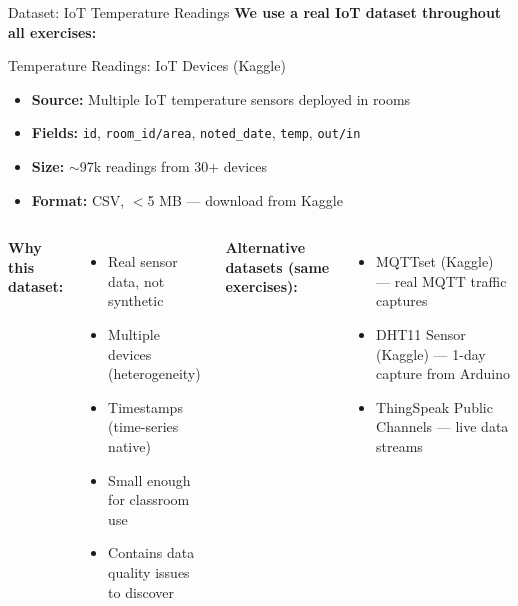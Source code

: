 \documentclass[aspectratio=169,11pt]{beamer}
\begin{document}
\begin{frame}{Dataset: IoT Temperature Readings}
    \textbf{We use a real IoT dataset throughout all exercises:}

    \vspace{0.2cm}
    \begin{block}{Temperature Readings: IoT Devices (Kaggle)}
        \begin{itemize}
            \item \textbf{Source:} Multiple IoT temperature sensors deployed in rooms
            \item \textbf{Fields:} \texttt{id}, \texttt{room\_id/area}, \texttt{noted\_date}, \texttt{temp}, \texttt{out/in}
            \item \textbf{Size:} $\sim$97k readings from 30+ devices
            \item \textbf{Format:} CSV, $<$5 MB --- download from Kaggle
        \end{itemize}
    \end{block}

    \vspace{0.2cm}
    \begin{columns}
        \textbf{Why this dataset:}
        \begin{itemize}
            \item Real sensor data, not synthetic
            \item Multiple devices (heterogeneity)
            \item Timestamps (time-series native)
            \item Small enough for classroom use
            \item Contains data quality issues to discover
        \end{itemize}

        \textbf{Alternative datasets (same exercises):}
        \begin{itemize}
            \item MQTTset (Kaggle) --- real MQTT traffic captures
            \item DHT11 Sensor (Kaggle) --- 1-day capture from Arduino
            \item ThingSpeak Public Channels --- live data streams
        \end{itemize}
    \end{columns}
\end{frame}

\end{document}
